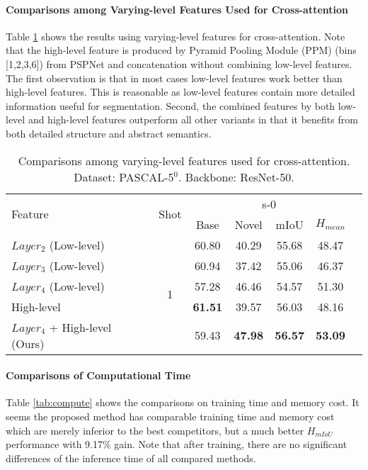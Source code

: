 \documentclass[journal]{IEEEtran}
\begin{document}
\paragraph{Comparisons among Varying-level Features Used for Cross-attention}
Table \ref{tab:feat_effect} shows the results using varying-level features for cross-attention.
Note that the high-level feature is produced by Pyramid Pooling Module (PPM) (bins [1,2,3,6]) from PSPNet \cite{zhao2017pyramid} and concatenation without combining low-level features.
The first observation is that in most cases low-level features work better than high-level features.
This is reasonable as low-level features contain more detailed information useful for segmentation.
Second, the combined features by both low-level and high-level features outperform all other variants in that it benefits from both detailed structure and abstract semantics.


\begin{table}[ht]
    \centering
    \caption{Comparisons among varying-level features used for cross-attention. Dataset: PASCAL-5$^{0}$. Backbone: ResNet-50.}
    \begin{adjustbox}{max width=0.48\textwidth}
    \begin{tabular}{l|c|ccccc}
    \hline
         \multirow{2}{*}{Feature} & \multirow{2}{*}{Shot} & \multicolumn{4}{c}{s-0} \\
         \cline{3-6}
          & & Base & Novel & mIoU & $H_{mean}$ \\
         \hline
         $Layer_2$ (Low-level) & \multirow{5}{*}{1} & 60.80 & 40.29 & 55.68 & 48.47 \\
         $Layer_3$ (Low-level) & & 60.94 & 37.42 & 55.06 & 46.37 \\
         $Layer_4$ (Low-level) & & 57.28 & 46.46 & 54.57 & 51.30 \\
         High-level & & \textbf{61.51} & 39.57 & 56.03 & 48.16 \\
         $Layer_4$ + High-level (Ours) & & 59.43 & \textbf{47.98} & \textbf{56.57} & \textbf{53.09} \\
    \hline
    \end{tabular}
    \end{adjustbox}
    \label{tab:feat_effect}
\end{table}

\paragraph{Comparisons of Computational Time}
Table \ref{tab:compute} shows the comparisons on training time and memory cost.
It seems the proposed method has comparable training time and memory cost which are merely inferior to the best competitors, but a much better $H_{mIoU}$ performance with 9.17\% gain.
Note that after training, there are no significant differences of the inference time of all compared methods.
\end{document}
